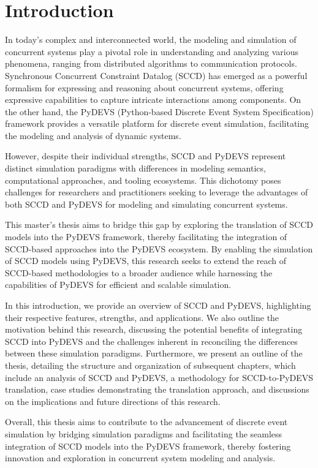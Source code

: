 \chapter{Introduction}
\label{chapt:Introduction}
In today's complex and interconnected world, the modeling and simulation of concurrent systems play a pivotal role in understanding and analyzing various phenomena, ranging from distributed algorithms to communication protocols. Synchronous Concurrent Constraint Datalog (SCCD) has emerged as a powerful formalism for expressing and reasoning about concurrent systems, offering expressive capabilities to capture intricate interactions among components. On the other hand, the PyDEVS (Python-based Discrete Event System Specification) framework provides a versatile platform for discrete event simulation, facilitating the modeling and analysis of dynamic systems.

However, despite their individual strengths, SCCD and PyDEVS represent distinct simulation paradigms with differences in modeling semantics, computational approaches, and tooling ecosystems. This dichotomy poses challenges for researchers and practitioners seeking to leverage the advantages of both SCCD and PyDEVS for modeling and simulating concurrent systems.

This master's thesis aims to bridge this gap by exploring the translation of SCCD models into the PyDEVS framework, thereby facilitating the integration of SCCD-based approaches into the PyDEVS ecosystem. By enabling the simulation of SCCD models using PyDEVS, this research seeks to extend the reach of SCCD-based methodologies to a broader audience while harnessing the capabilities of PyDEVS for efficient and scalable simulation.

In this introduction, we provide an overview of SCCD and PyDEVS, highlighting their respective features, strengths, and applications. We also outline the motivation behind this research, discussing the potential benefits of integrating SCCD into PyDEVS and the challenges inherent in reconciling the differences between these simulation paradigms. Furthermore, we present an outline of the thesis, detailing the structure and organization of subsequent chapters, which include an analysis of SCCD and PyDEVS, a methodology for SCCD-to-PyDEVS translation, case studies demonstrating the translation approach, and discussions on the implications and future directions of this research.

Overall, this thesis aims to contribute to the advancement of discrete event simulation by bridging simulation paradigms and facilitating the seamless integration of SCCD models into the PyDEVS framework, thereby fostering innovation and exploration in concurrent system modeling and analysis.

